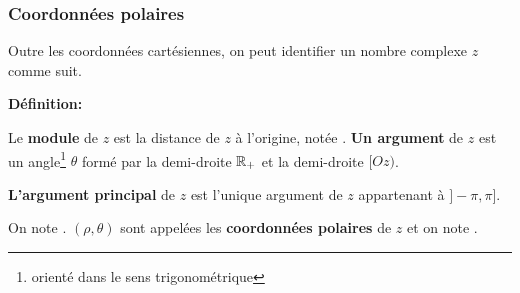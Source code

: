 
\begin{frame}%
\frametitle{\bf Coordonnées polaires}
\medskip 

Outre les coordonnées cartésiennes, on peut identifier un nombre complexe $z$ comme suit.

\medskip

{\bf D\'efinition:} 
\begin{itemize}
\bitem
Le {\bf module} de $z$ est la distance de $z$ à l'origine, notée . %
\bitem
{\bf Un argument} de $z$ est un angle\footnote{orienté dans le sens trigonométrique} $\theta$ formé par la demi-droite $\mathbb R_+$ et la demi-droite $[Oz)$.
\begin{center}
\end{center}
\bitem 
{\bf L'argument principal} de $z$ est l'unique argument de $z$ appartenant à $]-\pi,\pi]$. 

On note \framebox{${\theta=\arg(z)\in]-\pi,\pi]}$}.
\bitem
$(\rho,\theta)$ sont appelées les {\bf coordonnées polaires} de $z$ et on note .
\end{itemize}


\end{frame}
